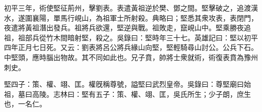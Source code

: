 \begin{pinyinscope}
初平三年，術使堅征荊州，擊劉表。表遣黃祖逆於樊、鄧之間。堅擊破之，追渡漢水，遂圍襄陽，單馬行峴山，為祖軍士所射殺。典略曰；堅悉其衆攻表，表閉門，夜遣將黃祖潛出發兵。祖將兵欲還，堅逆與戰。祖敗走，竄峴山中。堅乘勝夜追祖，祖部兵從竹木間暗射堅，殺之。吳錄曰：堅時年三十七。英雄記曰：堅以初平四年正月七日死。又云：劉表將呂公將兵緣山向堅，堅輕騎尋山討公。公兵下石。中堅頭，應時腦出物故。其不同如此也。兄子賁，帥將士衆就術，術復表賁為豫州刺史。

堅四子：策、權、翊、匡。權旣稱尊號，謚堅曰武烈皇帝。吳錄曰：尊堅廟曰始祖，墓曰高陵。志林曰：堅有五子：策、權、翊、匡，吳氏所生；少子朗，庶生也，一名仁。


\end{pinyinscope}